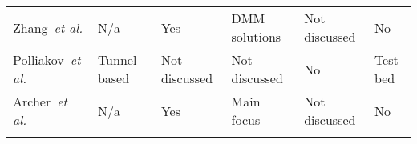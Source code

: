 \begin{table}[htb]
\begin{tabular}{p{2.8cm}p{2cm}p{2cm}p{2.2cm}p{2cm}p{2cm}}
    Zhang~\textit{et al.} \cite{Karimzadeh2014} &
    N/a & Yes & \ac{DMM} solutions & Not discussed & No \\
    \addlinespace
	\addlinespace
	
    Polliakov~\textit{et al.} \cite{Kempf2012a} &
    Tunnel-based & Not discussed & Not discussed & No & Test bed \\
    \addlinespace
	\addlinespace
	
    Archer~\textit{et al.} \cite{Kuklinski2014b} &
    N/a & Yes & Main focus & Not discussed & No \\
    \addlinespace
	\addlinespace
	
    \bottomrule
  \end{tabular}
\end{table}
